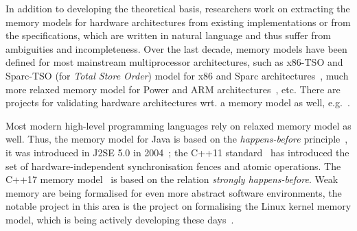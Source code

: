 In addition to developing the theoretical basis, researchers work on extracting the memory models for hardware architectures from existing implementations or from the specifications, which are written in natural language and thus suffer from ambiguities and incompleteness.
Over the last decade, memory models have been defined for most mainstream multiprocessor architectures, such as x86-TSO and Sparc-TSO (for \textit{Total Store Order}) model for x86 and Sparc architectures~\cite{owens2009better}, much more relaxed memory model for Power and ARM architectures~\cite{alglave2009semantics,sarkar2011understanding, alglave2014herding}, etc. %
There are projects for validating hardware architectures wrt. a memory model as well, e.g.~\cite{lustig2014pipecheck,lustig2016coatcheck}.


Most modern high-level programming languages rely on relaxed memory model as well.
Thus, the memory model for Java is based on the \textit{happens-before} principle~\cite{lamport1978time}, it was introduced in J2SE 5.0 in 2004~\cite{manson2005java}; the C++11 standard~\cite{iso2012iec} has introduced the set of hardware-independent synchronisation fences and atomic operations.
The C++17 memory model~\cite{batty2011mathematizing} is based on the relation \textit{strongly happens-before}. Weak memory are being formalised for even more abstract software environments, the notable project in this area is the project on formalising the Linux kernel memory model, which is being actively developing these days~\cite{alglave2018frightening, kernel1}.

